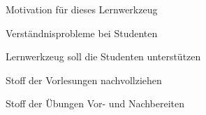 



{
    \begin{itemgroup}{}
	\item Motivation für dieses Lernwerkzeug
		\begin{itemgroup}{}
		\item Verständnisprobleme bei Studenten
		\end{itemgroup}	
		\item Lernwerkzeug soll die Studenten unterstützen
			\begin{itemgroup}{}
			\item Stoff der Vorlesungen nachvollziehen
			\item Stoff der Übungen Vor- und Nachbereiten
			\end{itemgroup}
	\end{itemgroup}
    
	\vfill{}
}


